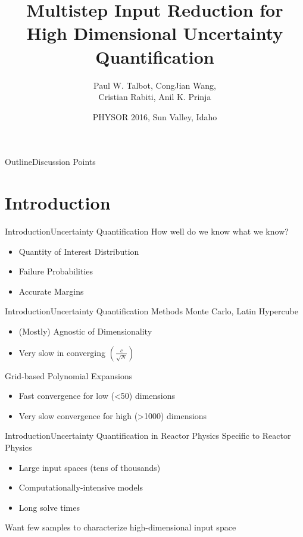 \documentclass{beamer}
\title[Multistep Input Reduction]
{Multistep Input Reduction for High Dimensional Uncertainty Quantification}
\author[Talbot] %
{Paul W. Talbot\inst{1}, CongJian Wang\inst{2}, \\ Cristian Rabiti\inst{2}, Anil K. Prinja\inst{1}}
\institute[University of New Mexico] %
{
  \inst{1}%
  University of New Mexico\\
  \inst{2}
  Idaho National Laboratory
}
\date[PHYSOR 2016] %
{PHYSOR 2016, Sun Valley, Idaho}
\begin{document}
\begin{frame}
  \titlepage
\end{frame}

\begin{frame}{Outline}{Discussion Points}\vspace{-20pt}
  \tableofcontents%
\end{frame}

\section{Introduction}
\begin{frame}{Introduction}{Uncertainty Quantification}\vspace{-30pt}
  How well do we know what we know?
  \vspace{10pt}
  \begin{itemize}
    \item Quantity of Interest Distribution
    \item Failure Probabilities
    \item Accurate Margins
  \end{itemize}
\end{frame}
\begin{frame}{Introduction}{Uncertainty Quantification Methods}\vspace{-30pt}
  Monte Carlo, Latin Hypercube
  \begin{itemize}
    \item (Mostly) Agnostic of Dimensionality
    \item Very slow in converging $\left(\frac{c}{\sqrt{N}}\right)$
  \end{itemize}
  \vspace{15pt}
  Grid-based Polynomial Expansions
  \begin{itemize}
    \item Fast convergence for low (<50) dimensions
    \item Very slow convergence for high (>1000) dimensions
  \end{itemize}
\end{frame}
\begin{frame}{Introduction}{Uncertainty Quantification in Reactor Physics}\vspace{-30pt}
  Specific to Reactor Physics
  \begin{itemize}
    \item Large input spaces (tens of thousands)
    \item Computationally-intensive models
    \item Long solve times
  \end{itemize}
  \vspace{15pt}
  Want few samples to characterize high-dimensional input space
\end{frame}
\end{document}
